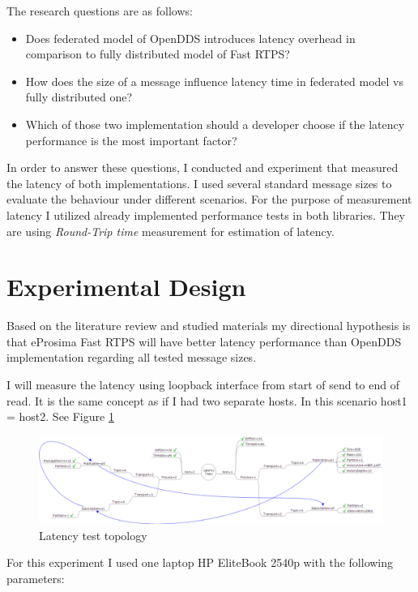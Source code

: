 \documentclass{csfourzero}
\begin{document}
The research questions are as follows:
\begin{itemize}
	\item Does federated model of OpenDDS introduces latency overhead in comparison to fully distributed model of Fast RTPS?
	\item How does the size of a message influence latency time in federated model vs fully distributed one?
	\item Which of those two implementation should a developer choose if the latency performance is the most important factor?
\end{itemize}

In order to answer these questions, I conducted and experiment that measured the latency of both implementations. I used several standard message sizes to evaluate the behaviour under different scenarios. For the purpose of measurement latency I utilized already implemented performance tests in both libraries. They are using \textit{Round-Trip time} measurement for estimation of latency. 

\section{Experimental Design}
\label{sec:exp}

\quad Based on the literature review and studied materials my directional hypothesis is that eProsima Fast RTPS will have better latency performance than OpenDDS implementation regarding all tested message sizes.

I will measure the latency using loopback interface from start of send to end of read. It is the same concept as if I had two separate hosts. In this scenario host1 = host2. See Figure \ref{fig:test-topology}

\begin{figure}[!h]
	\centering
	\includegraphics[width=1\textwidth]{openDDS-latency-tests}
	\caption{\label{fig:test-topology}Latency test topology
	\cite{openDDS-test-topology}}
\end{figure}

For this experiment I used one laptop HP EliteBook 2540p with the following parameters: 
\end{document}
